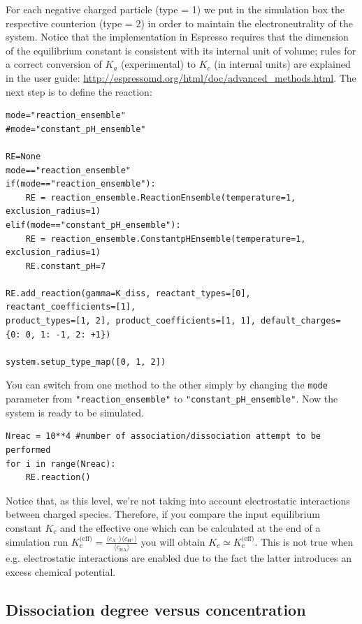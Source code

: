 \documentclass[
a4paper,                        %
11pt,                           %
twoside,                        %
footsepline,                    %
headsepline,                    %
headexclude,                    %
footexclude,                    %
pagesize,                       %
]{scrartcl}
\begin{document}
For each negative charged  particle (type = 1) we put in the simulation box the respective counterion  (type = 2) in order to maintain the electroneutrality of the system.
Notice that the implementation in Espresso requires that the dimension of the equilibrium constant is consistent with its internal unit of volume; rules for a correct conversion of $K_a$ (experimental) to $K_c$ (in internal units) are explained in the user guide: \url{http://espressomd.org/html/doc/advanced_methods.html}. The next step is to define the reaction:

\begin{verbatim}
mode="reaction_ensemble"
#mode="constant_pH_ensemble"

RE=None
mode=="reaction_ensemble"
if(mode=="reaction_ensemble"):
    RE = reaction_ensemble.ReactionEnsemble(temperature=1, exclusion_radius=1)
elif(mode=="constant_pH_ensemble"):
    RE = reaction_ensemble.ConstantpHEnsemble(temperature=1, exclusion_radius=1)
    RE.constant_pH=7
    
RE.add_reaction(gamma=K_diss, reactant_types=[0], reactant_coefficients=[1], 
product_types=[1, 2], product_coefficients=[1, 1], default_charges=
{0: 0, 1: -1, 2: +1})

system.setup_type_map([0, 1, 2])
\end{verbatim}
You can switch from one method to the other simply by changing the \texttt{mode} parameter from \texttt{"reaction\_ensemble"} to \texttt{"constant\_pH\_ensemble"}. Now the system is ready to be simulated.

\begin{verbatim}
Nreac = 10**4 #number of association/dissociation attempt to be performed
for i in range(Nreac):
    RE.reaction()
\end{verbatim}
Notice that, as this level, we're not taking into account electrostatic interactions between charged species. Therefore, if you compare the input equilibrium constant $K_c$ and the effective one which can be calculated at the end of a simulation run $K_c^{\text{(eff)}} = \frac{\langle c_{\text{A}^-} \rangle \langle c_{\text{H}^+} \rangle }{\langle c_\text{HA} \rangle}$ you will obtain $K_c \simeq K_c^\text{(eff)}$. This is not true when e.g. electrostatic interactions are enabled due to the fact the latter introduces an excess chemical potential.


\subsection{Dissociation degree versus concentration}
\end{document}
